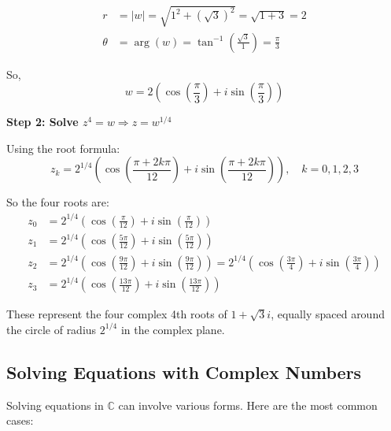 \begin{align*}
	r      & = |w| = \sqrt{1^2 + (\sqrt{3})^2} = \sqrt{1 + 3} = 2                    \\
	\theta & = \arg(w) = \tan^{-1} \left( \frac{\sqrt{3}}{1} \right) = \frac{\pi}{3}
\end{align*}

So,
\[
	w = 2 \left( \cos\left( \frac{\pi}{3} \right) + i \sin\left( \frac{\pi}{3} \right) \right)
\]

\textbf{Step 2: Solve \( z^4 = w \Rightarrow z = w^{1/4} \)}

Using the root formula:
\[
	z_k = 2^{1/4} \left( \cos\left( \frac{\pi + 2k\pi}{12} \right) + i \sin\left( \frac{\pi + 2k\pi}{12} \right) \right), \quad k = 0, 1, 2, 3
\]

So the four roots are:
\begin{align*}
	z_0 & = 2^{1/4} \left( \cos\left( \frac{\pi}{12} \right) + i \sin\left( \frac{\pi}{12} \right) \right)                                                                                                    \\
	z_1 & = 2^{1/4} \left( \cos\left( \frac{5\pi}{12} \right) + i \sin\left( \frac{5\pi}{12} \right) \right)                                                                                                  \\
	z_2 & = 2^{1/4} \left( \cos\left( \frac{9\pi}{12} \right) + i \sin\left( \frac{9\pi}{12} \right) \right) = 2^{1/4} \left( \cos\left( \frac{3\pi}{4} \right) + i \sin\left( \frac{3\pi}{4} \right) \right) \\
	z_3 & = 2^{1/4} \left( \cos\left( \frac{13\pi}{12} \right) + i \sin\left( \frac{13\pi}{12} \right) \right)
\end{align*}

These represent the four complex 4th roots of \( 1 + \sqrt{3}i \), equally spaced around the circle of radius \( 2^{1/4} \) in the complex plane.

\subsection{Solving Equations with Complex Numbers}

Solving equations in \( \mathbb{C} \) can involve various forms. Here are the most common cases:

